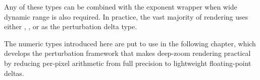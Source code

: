 Any of these types can be combined with the  exponent wrapper
when wide dynamic range is also required.  In practice, the vast majority of
rendering uses either , , or
 as the perturbation delta type.

The numeric types introduced here are put to use in the following chapter,
which develops the perturbation framework that makes deep-zoom rendering
practical by reducing per-pixel arithmetic from full precision to lightweight
floating-point deltas.

